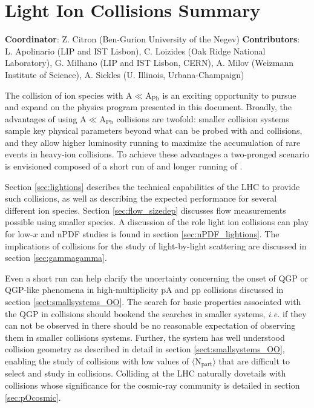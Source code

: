 \documentclass[../report.tex]{subfiles}
\begin{document}
\section{Light Ion Collisions Summary}
\label{sec:smallAsum}
{ \small
\noindent \textbf{Coordinator}: Z. Citron (Ben-Gurion University of the Negev)
\noindent \textbf{Contributors}:
L. Apolinario (LIP and IST Lisbon),
C. Loizides (Oak Ridge National Laboratory),
G. Milhano (LIP and IST Lisbon, CERN),
A. Milov (Weizmann Institute of Science),
A. Sickles (U. Illinois, Urbana-Champaign)
}


The collision of ion species with A$\ll$A$_\mathrm{Pb}$ is an exciting opportunity to pursue and expand on the physics program presented in this document.  Broadly, the advantages of using A$\ll$A$_\mathrm{Pb}$  collisions are twofold: smaller collision systems sample key physical parameters beyond what can be probed with \PbPb and \pPb collisions, and they allow higher luminosity running to maximize the accumulation of rare events in heavy-ion collisions. 
To achieve these advantages a two-pronged scenario is envisioned composed of a short run of \OO and longer running of \ArAr.

Section \ref{sec:lightions} describes the technical capabilities of the LHC to provide such collisions, as well as describing the expected performance for several different ion species.  Section \ref{sec:flow_sizedep} discusses flow measurements possible using smaller species.  A discussion of the role light ion collisions can play for low-$x$ and nPDF studies is found in section \ref{sec:nPDF_lightions}.  The implications of \ArAr collisions for the study of light-by-light scattering are discussed in section \ref{sec:gammagamma}. 

Even a short \OO run can help clarify the uncertainty concerning the onset of QGP or QGP-like phenomena in high-multiplicity pA and pp collisions discussed in section \ref{sect:smallsystems_OO}.  The search for basic properties associated with the QGP in \OO collisions should bookend the searches in smaller systems, \textit{i.e.} if they can not be observed in \OO there should be no reasonable expectation of observing them in smaller collisions systems.  Further, the \OO system has well understood collision geometry as described in detail in section \ref{sect:smallsystems_OO}, enabling the study of collisions with low values of $\langle \mathrm{N_{part}}\rangle$ that are difficult to select and study in \PbPb collisions.  Colliding \OO at the LHC naturally dovetails with \pO collisions whose significance for the cosmic-ray community is detailed in section \ref{sec:pOcosmic}.
\end{document}

